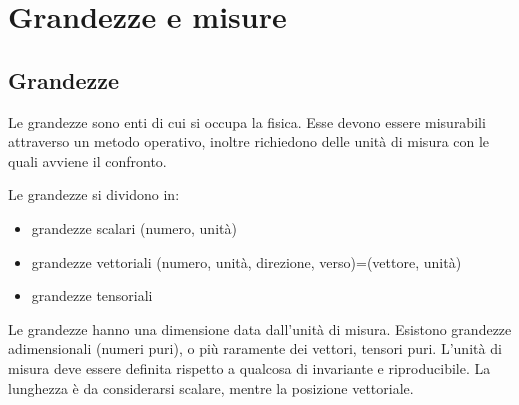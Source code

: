 \chapter{Grandezze e misure}
\minitoc
\section{Grandezze}
Le grandezze sono enti di cui si occupa la fisica. Esse devono essere misurabili attraverso un metodo operativo, inoltre richiedono delle unità di misura con le quali avviene il confronto.
\newline\par
Le grandezze si dividono in:
\begin{itemize}
  \item{}grandezze scalari (numero, unità)
  \item{}grandezze vettoriali
  (numero, unità, direzione, verso)=(vettore, unità)
  \item{}grandezze tensoriali
\end{itemize}
Le grandezze hanno una dimensione data dall'unità di misura. Esistono grandezze adimensionali (numeri puri), o più raramente dei vettori, tensori puri. L'unità di misura deve essere definita rispetto a qualcosa di invariante e riproducibile. La lunghezza è da considerarsi scalare, mentre la posizione vettoriale.

